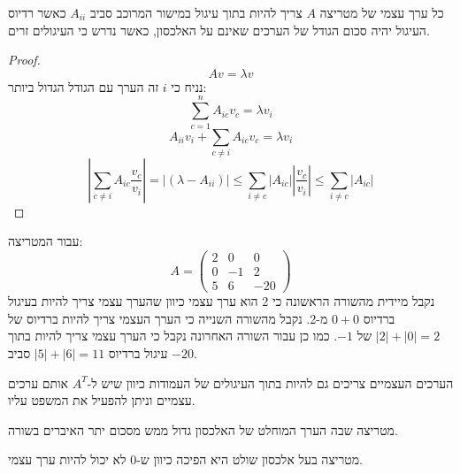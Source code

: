 \documentclass{tstextbook}
\begin{document}
\begin{proposition}
כל ערך עצמי של מטריצה \(A\) צריך להיות בתוך עיגול במישור המרוכב סביב \(A_{i i}\) כאשר רדיוס העיגול יהיה סכום הגודל של הערכים שאינם על האלכסון, כאשר נדרש כי העיגולים זרים.

\end{proposition}
\begin{proof}
$$Av=\lambda v$$
נניח כי \(i\) זה הערך עם הגודל הגדול ביותר:
$$\sum_{c=1}^{n} A_{i c}v_{c}=\lambda v_{i}$$$$A_{i i}v_{i}+\sum_{c\neq i} A_{ic} v_{c} = \lambda v_{i}$$$$\left\lvert  \sum_{c\neq i} A_{i c} \frac{v_{c}}{v_{i}}  \right\rvert =\left\lvert  \left( \lambda- A_{ii} \right)  \right\rvert \leq \sum_{i \neq c} \lvert A_{i c} \rvert \left\lvert  \frac{v_{c}}{v_{i}}  \right\rvert \leq \sum_{i\neq c} \lvert A_{i c} \rvert  $$

\end{proof}
\begin{example}
עבור המטריצה:
$$A=\begin{pmatrix}2 & 0 &  0 \\0 & -1 & 2 \\5 & 6 & -20
\end{pmatrix}$$
נקבל מיידית מהשורה הראשונה כי 2 הוא ערך עצמי כיוון שהערך עצמי צריך להיות בעיגול ברדיוס \(0+0\) מ-2. נקבל מהשורה השנייה כי הערך העצמי צריך להיות ברדיוס של \(|2|+|0|=2\) של \(-1\). כמו כן עבור השורה האחרונה נקבל כי הערך עצמי צריך להיות בתוך עיגול ברדיוס \(|5|+|6|=11\) סביב \(-20\).

\end{example}
\begin{corollary}
הערכים העצמיים צריכים גם להיות בתוך העיגולים של העמודות כיוון שיש ל-\(A^{T}\) אותם ערכים עצמיים וניתן להפעיל את המשפט עליו.

\end{corollary}
\begin{definition}
מטריצה שבה הערך המוחלט של האלכסון גדול ממש מסכום יתר האיברים בשורה.

\end{definition}
\begin{corollary}
מטריצה בעל אלכסון שולט היא הפיכה כיוון ש-0 לא יכול להיות ערך עצמי.

\end{corollary}
\end{document}
